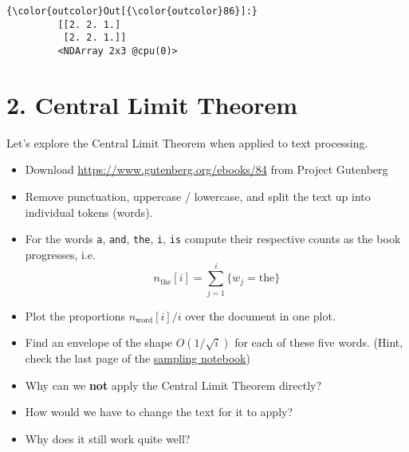 \documentclass[11pt]{article}
\providecommand{\tightlist}{%
      \setlength{\itemsep}{0pt}\setlength{\parskip}{0pt}}
\begin{document}
\begin{Verbatim}[commandchars=\\\{\}]
{\color{outcolor}Out[{\color{outcolor}86}]:} 
         [[2. 2. 1.]
          [2. 2. 1.]]
         <NDArray 2x3 @cpu(0)>
\end{Verbatim}
            
    \hypertarget{central-limit-theorem}{%
\section{2. Central Limit Theorem}\label{central-limit-theorem}}

Let's explore the Central Limit Theorem when applied to text processing.

\begin{itemize}
\tightlist
\item
  Download
  \href{https://www.gutenberg.org/files/84/84-0.txt}{https://www.gutenberg.org/ebooks/84}
  from Project Gutenberg
\item
  Remove punctuation, uppercase / lowercase, and split the text up into
  individual tokens (words).
\item
  For the words \texttt{a}, \texttt{and}, \texttt{the}, \texttt{i},
  \texttt{is} compute their respective counts as the book progresses,
  i.e. \[n_\mathrm{the}[i] = \sum_{j = 1}^i \{w_j = \mathrm{the}\}\]
\item
  Plot the proportions \(n_\mathrm{word}[i] / i\) over the document in
  one plot.
\item
  Find an envelope of the shape \(O(1/\sqrt{i})\) for each of these five
  words. (Hint, check the last page of the
  \href{http://courses.d2l.ai/berkeley-stat-157/slides/1_24/sampling.pdf}{sampling
  notebook})
\item
  Why can we \textbf{not} apply the Central Limit Theorem directly?
\item
  How would we have to change the text for it to apply?
\item
  Why does it still work quite well?
\end{itemize}
\end{document}
